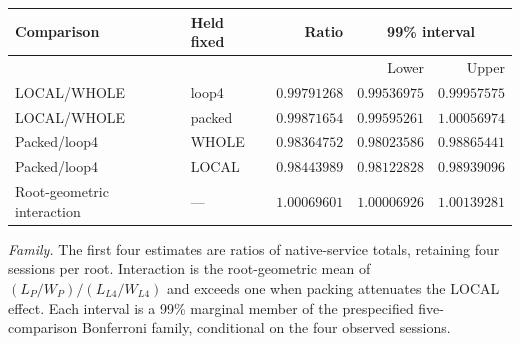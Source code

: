 \begingroup
\fontsize{8.7}{10.5}\selectfont
\setlength{\tabcolsep}{3.5pt}\renewcommand{\arraystretch}{1.03}
\noindent
\begin{tabularx}{\linewidth}{@{}>{\raggedright\arraybackslash}Xlrrr@{}}
\toprule
Comparison & Held fixed & Ratio & \multicolumn{2}{c}{99\% interval}\\
\cmidrule(lr){4-5}
 &  &  & Lower & Upper\\
\midrule
LOCAL/WHOLE & loop4 & $0.99791268$ & $0.99536975$ & $0.99957575$\\
LOCAL/WHOLE & packed & $0.99871654$ & $0.99595261$ & $1.00056974$\\
Packed/loop4 & WHOLE & $0.98364752$ & $0.98023586$ & $0.98865441$\\
Packed/loop4 & LOCAL & $0.98443989$ & $0.98122828$ & $0.98939096$\\
\midrule
Root-geometric interaction & --- & $1.00069601$ & $1.00006926$ & $1.00139281$\\
\bottomrule
\end{tabularx}
\par\smallskip
\fontsize{8}{9.6}\selectfont\raggedright
\textit{Family.} The first four estimates are ratios of native-service totals, retaining four sessions per root. Interaction is the root-geometric mean of $(L_P/W_P)/(L_{L4}/W_{L4})$ and exceeds one when packing attenuates the LOCAL effect. Each interval is a 99\% marginal member of the prespecified five-comparison Bonferroni family, conditional on the four observed sessions.
\par\endgroup

